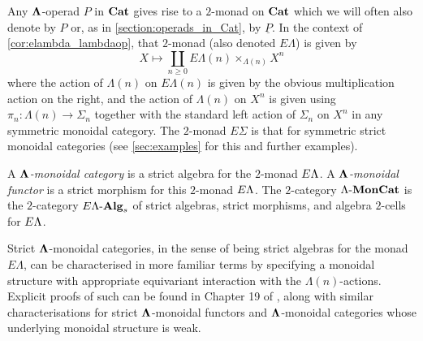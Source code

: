 Any $\mathbf{\Lambda}$-operad $P$ in $\mathbf{Cat}$ gives rise to a $2$-monad on $\mathbf{Cat}$ which we will often also denote by $P$ or, as in \cref{section:operads_in_Cat}, by $\underline{P}$. In the context of \cref{cor:elambda_lambdaop}, that $2$-monad (also denoted $E\Lambda$) is given by
  \[
    X \mapsto \coprod_{n \geq 0} E\Lambda(n) \times_{\Lambda(n)} X^{n}
  \]
where the action of $\Lambda(n)$ on $E\Lambda(n)$ is given by the obvious multiplication action on the right, and the action of $\Lambda(n)$ on $X^{n}$ is given using $\pi_{n} \colon \Lambda(n) \rightarrow \Sigma_{n}$ together with the standard left action of $\Sigma_{n}$ on $X^{n}$ in any symmetric monoidal category. The $2$-monad $E\Sigma$ is that for symmetric strict monoidal categories (see \cref{sec:examples} for this and further examples).

\begin{Defi}\label{lmc}
A \emph{$\mathbf{\Lambda}$-monoidal category} is a strict algebra for the $2$-monad $E\Lambda$. A \emph{$\mathbf{\Lambda}$-monoidal functor} is a strict morphism for this $2$-monad $E\Lambda$. The $2$-category $\Lambda\mbox{-}\mathbf{MonCat}$ is the $2$-category $E\Lambda\mbox{-}\mathbf{Alg}_{s}$ of strict algebras, strict morphisms, and algebra $2$-cells for $E\Lambda$.
\end{Defi}


Strict $\mathbf{\Lambda}$-monoidal categories, in the sense of being strict algebras for the monad $E\Lambda$, can be characterised in more familiar terms by specifying a monoidal structure with appropriate equivariant interaction with the $\Lambda(n)$-actions. Explicit proofs of such can be found in Chapter 19 of \cite{yau_infinity_2021}, along with similar characterisations for strict $\mathbf{\Lambda}$-monoidal functors and $\mathbf{\Lambda}$-monoidal categories whose underlying monoidal structure is weak.


